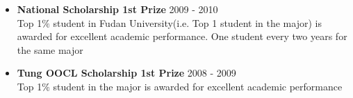 \documentclass[10pt]{res} %
\begin{document}
\begin{resume}
\vspace{15pt} %

\begin{itemize}
\item {\bf National Scholarship 1st Prize} \hfill 2009 - 2010\\
Top 1$\%$ student in Fudan University(i.e. Top 1 student in the major) is awarded for excellent academic performance. One student every two years for the same major
\item {\bf Tung OOCL Scholarship 1st Prize} \hfill 2008 - 2009 \\
Top 1$\%$ student in the major is awarded for excellent academic performance
\end{itemize}


\vspace{0.2in} %






\end{resume}
\end{document}
